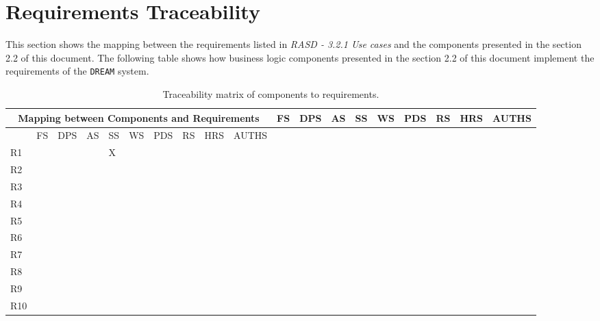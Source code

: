 \documentclass{article}
\begin{document}
\section{Requirements Traceability}
This section shows the mapping between the requirements listed in \textit{RASD - 3.2.1 Use cases} and the components presented in the section  2.2 of this document.
\newline
\newline
The following table shows how business logic components presented in the section  2.2 of this document implement the requirements of the \verb|DREAM| system.
\begin{longtable}[c]{|m{0.15cm}|m{0.15cm}|m{0.15cm}|m{0.15cm}|m{0.15cm}|m{0.15cm}|m{0.15cm}|m{0.15cm}|m{0.15cm}|m{0.15cm}|}
 \caption{Traceability matrix of components to requirements.}
 \label{comp-req mapping}
 \hline
 \multicolumn{10}{|c|}{\cellcolor{white}Mapping between Components and Requirements}
 \endfirsthead
 \hline
  \cellcolor{yellow!30} & \cellcolor{white}FS & \cellcolor{white}DPS & \cellcolor{white}AS & \cellcolor{white}SS & \cellcolor{white}WS & \cellcolor{white}PDS & \cellcolor{white}RS & \cellcolor{white}HRS &  \cellcolor{white}AUTHS \\
 \endhead
 \endfoot
 \endlastfoot
 \hline
  \cellcolor{yellow!30} & \cellcolor{white}FS & \cellcolor{white}DPS & \cellcolor{white}AS & \cellcolor{white}SS & \cellcolor{white}WS & \cellcolor{white}PDS & \cellcolor{white}RS & \cellcolor{white}HRS &  \cellcolor{white}AUTHS \\
 \hline
 R1 &   &  &  &  X &  &   &  &   &    \\
 \hline
 R2 &  &  &  &   &  &   &  &   &     \\
 \hline
 R3 &  &  &  &   &  &   &  &   &     \\
 \hline
 R4 &  &  &  &  &  &   &  &   &     \\
 \hline
 R5 &  &   &   &   &   &   &  &   &     \\
 \hline
 R6 &  &   &   &   &   &   &   &   &      \\
 \hline
 R7 &  &   &   &   &   &   &   &   &      \\
 \hline
 R8 &  &   &   &   &   &   &   &   &     \\
 \hline
 R9 &   &  &   &   &   &   &   &   &      \\
 \hline
 R10 &   &  &  &   &   &   &   &   &     \\

\end{longtable}
\end{document}
